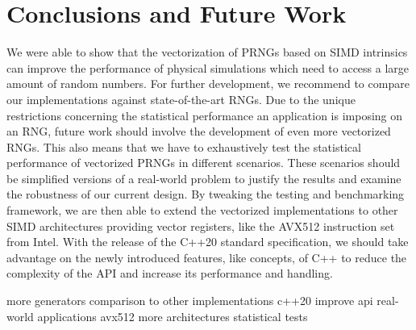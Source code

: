 \documentclass[crop=false]{stdlocal}
\begin{document}
\section{Conclusions and Future Work} %
\label{sec:conclusions}
  We were able to show that the vectorization of PRNGs based on SIMD intrinsics can improve the performance of physical simulations which need to access a large amount of random numbers.
  For further development, we recommend to compare our implementations against state-of-the-art RNGs.
  Due to the unique restrictions concerning the statistical performance an application is imposing on an RNG, future work should involve the development of even more vectorized RNGs.
  This also means that we have to exhaustively test the statistical performance of vectorized PRNGs in different scenarios.
  These scenarios should be simplified versions of a real-world problem to justify the results and examine the robustness of our current design.
  By tweaking the testing and benchmarking framework, we are then able to extend the vectorized implementations to other SIMD architectures providing vector registers, like the AVX512 instruction set from Intel.
  With the release of the C++20 standard specification, we should take advantage on the newly introduced features, like concepts, of C++ to reduce the complexity of the API and increase its performance and handling.

  more generators
  comparison to other implementations
  c++20 improve api
  real-world applications
  avx512
  more architectures
  statistical tests
\end{document}
